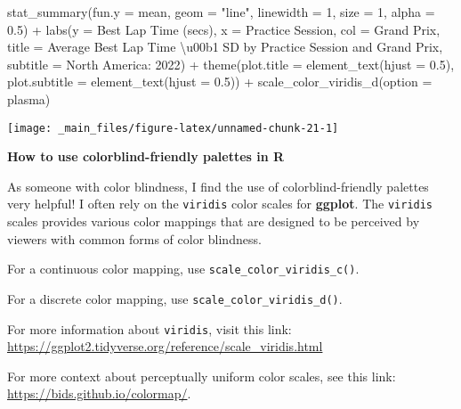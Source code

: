 \documentclass[
]{book}
\newenvironment{Shaded}{\begin{snugshade}}{\end{snugshade}}
\newcommand{\AttributeTok}[1]{\textcolor[rgb]{0.77,0.63,0.00}{#1}}
\newcommand{\DecValTok}[1]{\textcolor[rgb]{0.00,0.00,0.81}{#1}}
\newcommand{\FloatTok}[1]{\textcolor[rgb]{0.00,0.00,0.81}{#1}}
\newcommand{\FunctionTok}[1]{\textcolor[rgb]{0.00,0.00,0.00}{#1}}
\newcommand{\NormalTok}[1]{#1}
\newcommand{\SpecialCharTok}[1]{\textcolor[rgb]{0.00,0.00,0.00}{#1}}
\newcommand{\StringTok}[1]{\textcolor[rgb]{0.31,0.60,0.02}{#1}}
\begin{document}
\begin{Shaded}
\begin{Highlighting}[]
  \FunctionTok{stat\_summary}\NormalTok{(}\AttributeTok{fun.y =}\NormalTok{ mean,}
               \AttributeTok{geom =} \StringTok{"line"}\NormalTok{, }
               \AttributeTok{linewidth =} \DecValTok{1}\NormalTok{, }\AttributeTok{size =} \DecValTok{1}\NormalTok{, }\AttributeTok{alpha =} \FloatTok{0.5}\NormalTok{) }\SpecialCharTok{+}
  \FunctionTok{labs}\NormalTok{(}\AttributeTok{y =} \StringTok{\textquotesingle{}Best Lap Time (secs)\textquotesingle{}}\NormalTok{,}
       \AttributeTok{x =} \StringTok{\textquotesingle{}Practice Session\textquotesingle{}}\NormalTok{,}
       \AttributeTok{col =} \StringTok{\textquotesingle{}Grand Prix\textquotesingle{}}\NormalTok{,}
       \AttributeTok{title =} \StringTok{\textquotesingle{}Average Best Lap Time \textbackslash{}u00b1 SD by Practice Session and Grand Prix\textquotesingle{}}\NormalTok{,}
       \AttributeTok{subtitle =} \StringTok{\textquotesingle{}North America: 2022\textquotesingle{}}\NormalTok{) }\SpecialCharTok{+}
  \FunctionTok{theme}\NormalTok{(}\AttributeTok{plot.title =} \FunctionTok{element\_text}\NormalTok{(}\AttributeTok{hjust =} \FloatTok{0.5}\NormalTok{),}
        \AttributeTok{plot.subtitle =} \FunctionTok{element\_text}\NormalTok{(}\AttributeTok{hjust =} \FloatTok{0.5}\NormalTok{)) }\SpecialCharTok{+}
  \FunctionTok{scale\_color\_viridis\_d}\NormalTok{(}\AttributeTok{option =} \StringTok{\textquotesingle{}plasma\textquotesingle{}}\NormalTok{)}
\end{Highlighting}
\end{Shaded}

\begin{center}\texttt{[image: \_main\_files/figure-latex/unnamed-chunk-21-1]} \end{center}

\begin{blackbox}

\begin{center}
\textbf{How to use colorblind-friendly palettes in R}

\end{center}

As someone with color blindness, I find the use of colorblind-friendly palettes very helpful! I often rely on the \texttt{viridis} color scales for \textbf{ggplot}. The \texttt{viridis} scales provides various color mappings that are designed to be perceived by viewers with common forms of color blindness.

For a continuous color mapping, use \texttt{scale\_color\_viridis\_c()}.

For a discrete color mapping, use \texttt{scale\_color\_viridis\_d()}.

For more information about \texttt{viridis}, visit this link: \url{https://ggplot2.tidyverse.org/reference/scale_viridis.html}

For more context about perceptually uniform color scales, see this link:
\url{https://bids.github.io/colormap/}.

\end{blackbox}
\end{document}
